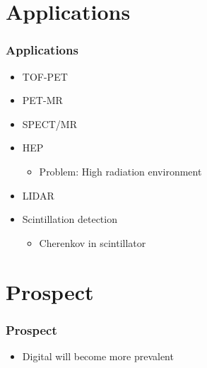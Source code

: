 \documentclass{beamer}
\begin{document}
\section{Applications}
\begin{frame}
  \frametitle{Applications}
  \begin{itemize}
    \item TOF-PET
    \item PET-MR
    \item SPECT/MR
    \item HEP
      \begin{itemize}
        \item Problem: High radiation environment
      \end{itemize}
    \item LIDAR
    \item Scintillation detection
      \begin{itemize}
        \item Cherenkov in scintillator
      \end{itemize}
  \end{itemize}
\end{frame}

\section{Prospect}
\begin{frame}
  \frametitle{Prospect}
  \begin{itemize}
    \item Digital will become more prevalent
  \end{itemize}
\end{frame}


































\end{document}
